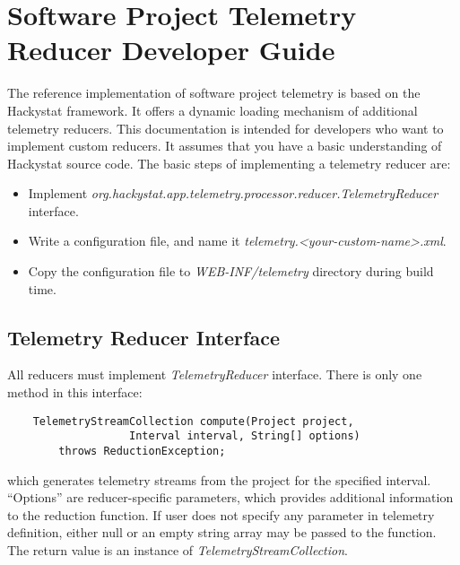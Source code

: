 \chapter{Software Project Telemetry Reducer Developer Guide}
\label{Chapter:TelemetryDeveloperGuide}


The reference implementation of software project telemetry is based on the Hackystat framework. It offers a dynamic loading mechanism of additional telemetry reducers. This documentation is intended for developers who want to implement custom reducers. It assumes that you have a basic understanding of Hackystat source code. The basic steps of implementing a telemetry reducer are:

\begin{itemize}
  \setlength{\itemsep}{0pt}
  \setlength{\parskip}{0pt}
	\item Implement \textit{org.hackystat.app.telemetry.processor.reducer.TelemetryReducer} interface.
  \item Write a configuration file, and name it \textit{telemetry.\textless your-custom-name\textgreater.xml}.
  \item Copy the configuration file to \textit{WEB-INF/telemetry} directory during build time.
\end{itemize}
 
 
 
 
 
\section{Telemetry Reducer Interface}

All reducers must implement \textit{TelemetryReducer} interface. There is only one method in this interface:

\begin{verbatim}
    TelemetryStreamCollection compute(Project project, 
                   Interval interval, String[] options)
        throws ReductionException;
\end{verbatim}
which generates telemetry streams from the project for the specified interval. ``Options'' are reducer-specific parameters, which provides additional information to the reduction function. If user does not specify any parameter in telemetry definition, either null or an empty string array may be passed to the function. The return value is an instance of \textit{TelemetryStreamCollection}.

 
 
 
 
